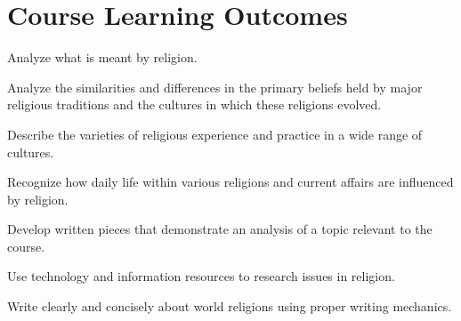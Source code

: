 \documentclass{article}
\begin{document}
\section*{Course Learning Outcomes}
\begin{enumerate*}
	\item Analyze what is meant by religion.
	\item Analyze the similarities and differences in the primary beliefs held by major religious traditions and the cultures in which these religions evolved. 
	\item Describe the varieties of religious experience and practice in a wide range of cultures.
	\item Recognize how daily life within various religions and current affairs are influenced by religion.
	\item Develop written pieces that demonstrate an analysis of a topic relevant to the course.
	\item Use technology and information resources to research issues in religion.
	\item Write clearly and concisely about world religions using proper writing mechanics.
\end{enumerate*}






\end{document}
